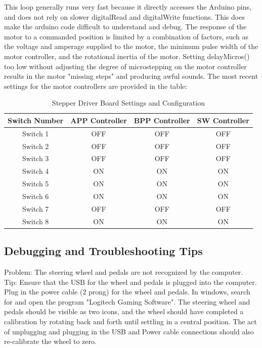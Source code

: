 \documentclass[12pt,oneside,letterpaper]{article}
\begin{document}
This loop generally runs very fast because it directly accesses the Arduino pins, and does not rely on slower digitalRead and digitalWrite functions. This does make the arduino code difficult to understand and debug. The response of the motor to a commanded position is limited by a combination of factors, such as the voltage and amperage supplied to the motor, the minimum pulse width of the motor controller, and the rotational inertia of the motor. Setting delayMicros() too low without adjusting the degree of microstepping on the motor controller results in the motor "missing steps" and producing awful sounds. The most recent settings for the motor controllers are provided in the table: 

\begin{table}[h]
\centering
 \begin{tabular}{| c | c | c | c|}
 \hline
 Switch Number & APP Controller & BPP Controller & SW Controller \\
 \hline 
 Switch 1 & OFF & OFF  & OFF \\
 Switch 2 & OFF & OFF & OFF \\
 Switch 3 & OFF & OFF & OFF \\
 Switch 4 & ON & ON & ON \\
 Switch 5 & ON & ON & ON \\
 Switch 6 & ON & ON & ON \\
 Switch 7 & OFF& OFF & OFF \\
 Switch 8 & ON & ON & ON \\

 \hline
 \end{tabular}
 \caption{Stepper Driver Board Settings and Configuration}
 \label{table:StepperSettings}
\end{table}

\label{table: Most Recent Settings for Motor Controllers}

\subsection{Debugging and Troubleshooting Tips}

Problem: The steering wheel and pedals are not recognized by the computer. \\
Tip: Ensure that the USB for the wheel and pedals is plugged into the computer. Plug in the power cable (2 prong) for the wheel and pedals. In windows, search for and open the program "Logitech Gaming Software". The steering wheel and pedals should be visible as two icons, and the wheel should have completed a calibration by rotating back and forth until settling in a central position. The act of unplugging and plugging in the USB and Power cable connections should also re-calibrate the wheel to zero. \label{poi:Calibration} \\
\end{document}
